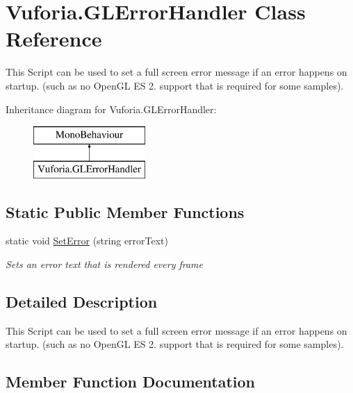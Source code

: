 \hypertarget{class_vuforia_1_1_g_l_error_handler}{}\section{Vuforia.\+G\+L\+Error\+Handler Class Reference}
\label{class_vuforia_1_1_g_l_error_handler}


This Script can be used to set a full screen error message if an error happens on startup. (such as no Open\+G\+L E\+S 2. support that is required for some samples).  


Inheritance diagram for Vuforia.\+G\+L\+Error\+Handler\+:\begin{figure}[H]
\begin{center}
\leavevmode
\includegraphics[height=2.000000cm]{class_vuforia_1_1_g_l_error_handler}
\end{center}
\end{figure}
\subsection*{Static Public Member Functions}
\begin{DoxyCompactItemize}
\item 
static void \hyperlink{class_vuforia_1_1_g_l_error_handler_a1bdd658043e72f75810337eae27e99c6_a1bdd658043e72f75810337eae27e99c6}{Set\+Error} (string error\+Text)
\begin{DoxyCompactList}\small\item\em Sets an error text that is rendered every frame \end{DoxyCompactList}\end{DoxyCompactItemize}


\subsection{Detailed Description}
This Script can be used to set a full screen error message if an error happens on startup. (such as no Open\+G\+L E\+S 2. support that is required for some samples). 



\subsection{Member Function Documentation}
\hypertarget{class_vuforia_1_1_g_l_error_handler_a1bdd658043e72f75810337eae27e99c6_a1bdd658043e72f75810337eae27e99c6}{}
